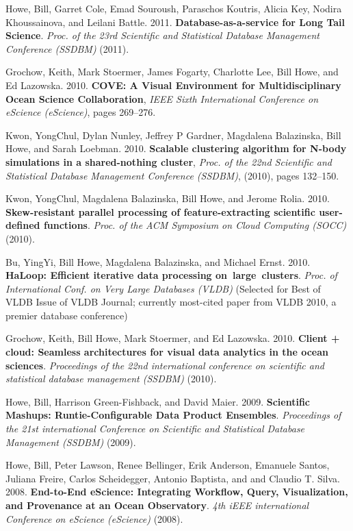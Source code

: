 \begin{bulletlist}
\item Howe, Bill, Garret Cole, Emad Souroush, Paraschos Koutris, Alicia Key, Nodira
Khoussainova, and Leilani Battle. 2011. \textbf{Database-as-a-service for Long
Tail Science}. \emph{Proc. of the 23rd Scientific and Statistical
Database Management Conference (SSDBM)} (2011). 

\item Grochow, Keith, Mark Stoermer, James Fogarty, Charlotte Lee, Bill Howe, and Ed Lazowska. 2010. \textbf{COVE: A Visual Environment for Multidisciplinary Ocean Science Collaboration},
\emph{IEEE Sixth International Conference on eScience (eScience)}, pages 269--276.

\item Kwon, YongChul, Dylan Nunley, Jeffrey P Gardner, Magdalena Balazinska, Bill Howe, and Sarah Loebman. 2010. \textbf{Scalable clustering algorithm for N-body simulations in a shared-nothing cluster}, \emph{Proc. of the 22nd Scientific and Statistical
Database Management Conference (SSDBM)}, (2010), pages 132--150.

\item Kwon, YongChul, Magdalena Balazinska, Bill Howe, and Jerome Rolia.
2010. \textbf{Skew-resistant parallel processing of feature-extracting
scientific user-defined functions}. \emph{Proc. of the ACM Symposium on
Cloud Computing (SOCC)} (2010). 

\item Bu, YingYi, Bill Howe, Magdalena Balazinska, and Michael Ernst. 2010.
\textbf{HaLoop: Efficient iterative data processing on~large~clusters}.
\emph{Proc. of International Conf. on Very Large Databases (VLDB)} (Selected for Best of VLDB Issue of VLDB Journal; currently most-cited paper from VLDB 2010, a premier database conference)

\item Grochow, Keith, Bill Howe, Mark Stoermer, and Ed Lazowska. 2010. 
\textbf{Client + cloud: Seamless
architectures for visual data analytics in the ocean sciences}.
\emph{Proceedings of the 22nd international conference on scientific and
statistical database management (SSDBM)} (2010). 

\item Howe, Bill, Harrison Green-Fishback, and David Maier. 2009. \textbf{Scientific Mashups:
Runtie-Configurable Data Product Ensembles}. \emph{Proceedings of the
21st international Conference on Scientific and Statistical Database
Management (SSDBM)} (2009). 

\item Howe, Bill, Peter Lawson, Renee
Bellinger, Erik Anderson, Emanuele Santos, Juliana Freire, Carlos
Scheidegger, Antonio Baptista, and and Claudio T. Silva. 2008.
\textbf{End-to-End eScience: Integrating Workflow, Query, Visualization, and
Provenance at an Ocean Observatory}. \emph{4th iEEE international
Conference on eScience (eScience)} (2008).


\end{bulletlist}
